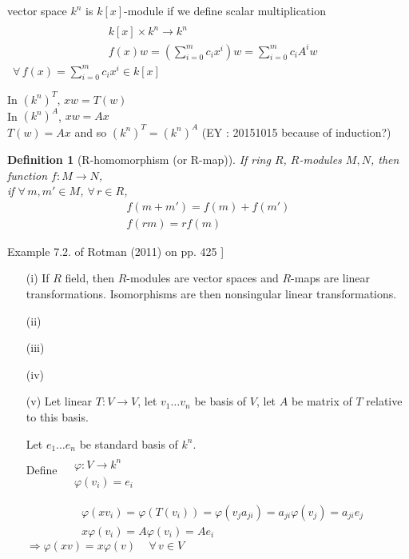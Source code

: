 \documentclass[10pt]{amsart}
\newtheorem{definition}{Definition}
\begin{document}
\begin{multicols*}{2}
\begin{enumerate}
	vector space $k^n$ is $k[x]$-module if we define scalar multiplication 
	\[
	\begin{aligned} & \quad \\
	& k[x] \times k^n \to k^n \\
	& f(x)w = \left( \sum_{i=0}^m c_ix^i \right)w = \sum_{i=0}^m c_i A^i w \end{aligned}
	\] 
	\quad \, $\forall \, f(x) = \sum_{i=0}^m c_ix^i \in k[x]$
	
	In $(k^n)^T$, $xw = T(w)$ \\
	In $(k^n)^A$, $xw = Ax $ \\
	$T(w) = Ax$ and so $(k^n)^T = (k^n)^A$  (EY : 20151015 because of induction?)
\end{enumerate}


\begin{definition}[R-homomorphism (or R-map)]
If ring $R$, $R$-modules $M,N$, then \\
function $f: M\to N$, \\
if $\forall \, m, m' \in M$, $\forall \, r\in R$, 
\[
\begin{gathered}
	f(m+m') = f(m) + f(m') \\ 
f(rm) = rf(m)
\end{gathered}
\]
\end{definition}

Example 7.2. of Rotman (2011) on pp. 425 \cite{JRotman2010}] 

\begin{enumerate}
	\item[(i)] If $R$ field, then $R$-modules are vector spaces and $R$-maps are linear transformations.  Isomorphisms are then nonsingular linear transformations.  
	\item[(ii)] 
	\item[(iii)]
	\item[(iv)]
	\item[(v)] Let linear $T:V \to V$, let $v_1 \dots v_n$ be basis of $V$, let $A$ be matrix of $T$ relative to this basis.  
	
	Let $e_1 \dots e_n$ be standard basis of $k^n$.  \\
	Define $\begin{aligned} & \quad \\
	& \varphi : V \to k^n \\
	& \varphi(v_i) = e_i \end{aligned}$
	
	\[
	\begin{aligned}
	& \varphi(xv_i) = \varphi(T(v_i)) = \varphi(v_j a_{ji} ) = a_{ji} \varphi(v_j) = a_{ji}e_j \\
	& x\varphi(v_i) = A\varphi(v_i) = Ae_i
	\end{aligned}
	\]
	$\Longrightarrow \varphi(xv) = x\varphi(v) \quad \, \forall \, v \in V$
	

\end{enumerate}
\end{multicols*}
\end{document}
